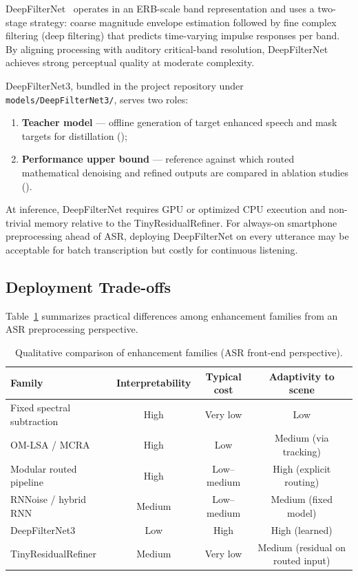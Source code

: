 DeepFilterNet~\cite{deepfilternet2023} operates in an ERB-scale band representation and uses a two-stage strategy: coarse magnitude envelope estimation followed by fine complex filtering (deep filtering) that predicts time-varying impulse responses per band. By aligning processing with auditory critical-band resolution, DeepFilterNet achieves strong perceptual quality at moderate complexity.

DeepFilterNet3, bundled in the project repository under \texttt{models/DeepFilterNet3/}, serves two roles:
\begin{enumerate}
  \item \textbf{Teacher model} --- offline generation of target enhanced speech and mask targets for distillation ();
  \item \textbf{Performance upper bound} --- reference against which routed mathematical denoising and refined outputs are compared in ablation studies ().
\end{enumerate}
At inference, DeepFilterNet requires GPU or optimized CPU execution and non-trivial memory relative to the TinyResidualRefiner. For always-on smartphone preprocessing ahead of ASR, deploying DeepFilterNet on every utterance may be acceptable for batch transcription but costly for continuous listening.

\subsection{Deployment Trade-offs}
\label{sec:dl_tradeoffs}

Table~\ref{tab:method_tradeoffs} summarizes practical differences among enhancement families from an ASR preprocessing perspective.

\begin{table}[H]
  \centering
  \caption{Qualitative comparison of enhancement families (ASR front-end perspective).}
  \label{tab:method_tradeoffs}
  \begin{tabular}{lccc}
    \toprule
    \textbf{Family} & \textbf{Interpretability} & \textbf{Typical cost} & \textbf{Adaptivity to scene} \\
    \midrule
    Fixed spectral subtraction & High & Very low & Low \\
    OM-LSA / MCRA             & High & Low & Medium (via tracking) \\
    Modular routed pipeline   & High & Low--medium & High (explicit routing) \\
    RNNoise / hybrid RNN      & Medium & Low--medium & Medium (fixed model) \\
    DeepFilterNet3            & Low & High & High (learned) \\
    TinyResidualRefiner       & Medium & Very low & Medium (residual on routed input) \\
    \bottomrule
  \end{tabular}
\end{table}

